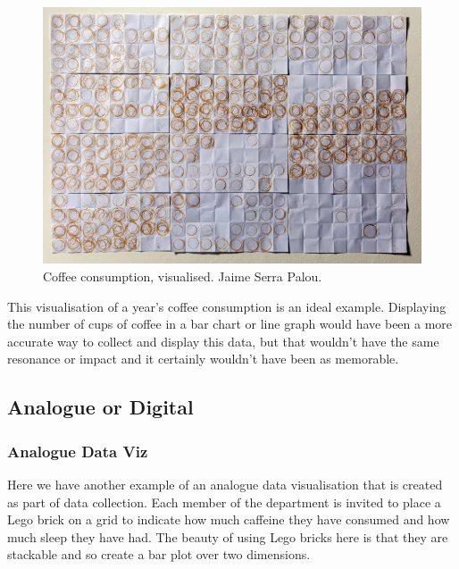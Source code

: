 \documentclass[
  letterpaper,
  DIV=11,
  numbers=noendperiod]{scrreprt}
\begin{document}
\begin{figure}[H]

{\centering \includegraphics[width=1\textwidth,height=\textheight]{images/303-data-visualisation/coffee-2.png}

}

\caption{Coffee consumption, visualised. Jaime Serra Palou.}

\end{figure}%

This visualisation of a year's coffee consumption is an ideal example.
Displaying the number of cups of coffee in a bar chart or line graph
would have been a more accurate way to collect and display this data,
but that wouldn't have the same resonance or impact and it certainly
wouldn't have been as memorable.

\subsection{Analogue or Digital}\label{analogue-or-digital}

\subsubsection{Analogue Data Viz}\label{analogue-data-viz}

Here we have another example of an analogue data visualisation that is
created as part of data collection. Each member of the department is
invited to place a Lego brick on a grid to indicate how much caffeine
they have consumed and how much sleep they have had. The beauty of using
Lego bricks here is that they are stackable and so create a bar plot
over two dimensions.
\end{document}
